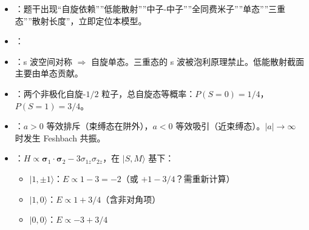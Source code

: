 \begin{tipbox}[快速识别与解题技巧]
\begin{itemize}
    \item {}：题干出现``自旋依赖''''低能散射''''中子-中子''''全同费米子''''单态''''三重态''''散射长度''，立即定位本模型。
    \item {}：
    \begin{center}
    \end{center}
    \item {}：s 波空间对称 $\Rightarrow$ 自旋单态。三重态的 s 波被泡利原理禁止。低能散射截面主要由单态贡献。
    \item {}：两个非极化自旋-$1/2$ 粒子，总自旋态等概率：$P(S=0)=1/4$，$P(S=1)=3/4$。
    \item {}：$a>0$ 等效排斥（束缚态在阱外），$a<0$ 等效吸引（近束缚态）。$|a|\to\infty$ 时发生 Feshbach 共振。
    \item {}：$H\propto\boldsymbol{\sigma}_1\cdot\boldsymbol{\sigma}_2-3\sigma_{1z}\sigma_{2z}$，在 $|S,M\rangle$ 基下：
    \begin{itemize}[nosep]
        \item $|1,\pm1\rangle$：$E\propto1-3=-2$（或 $+1-3/4$？需重新计算）
        \item $|1,0\rangle$：$E\propto1+3/4$（含非对角项）
        \item $|0,0\rangle$：$E\propto-3+3/4$
    \end{itemize}
\end{itemize}
\end{tipbox}

